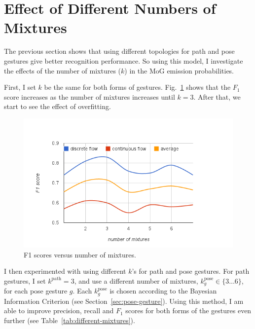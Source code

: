 \section{Effect of Different Numbers of Mixtures}
The previous section shows that using different topologies for path and pose
gestures give better
recognition performance. So using this model, I investigate the effects
of the number of mixtures ($k$) in the MoG emission probabilities.

First, I set $k$ be the same for both forms of gestures.
Fig.~\ref{fig:mixtures} shows that the $F_1$ score increases as the number of
mixtures increases until $k=3$.
After that, we start to see the effect of overfitting.

\begin{figure}[tbh]
\centering
\includegraphics[trim=10mm 5mm 10mm 15mm,
clip, width=\columnwidth]{figures/f1_nM.png}
\caption{F1 scores versus number of mixtures.}
\label{fig:mixtures}
\end{figure}

I then experimented with using different $k$'s for path and pose gestures. For
path gestures, I
set $k^\text{path} = 3$, and use a different number of
mixtures, $k^{\text{pose}}_g\in \{3\ldots6\}$, for each pose gesture $g$. Each
$k^{\text{pose}}_g$ is chosen according to the Bayesian Information Criterion
(see Section~\ref{sec:pose-gesture}).
Using this method, I am able to improve precision, recall and $F_1$ scores for
both forms of the gestures even further (see
Table~\ref{tab:different-mixtures}).

